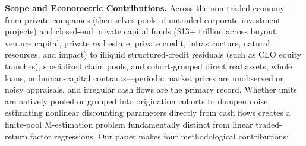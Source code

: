\documentclass[11pt]{article}
\begin{document}
\textbf{Scope and Econometric Contributions.} Across the non-traded economy---from private companies (themselves pools of untraded corporate investment projects) and closed-end private capital funds (\$13+ trillion across buyout, venture capital, private real estate, private credit, infrastructure, natural resources, and impact) to illiquid structured-credit residuals (such as CLO equity tranches), specialized claim pools, and cohort-grouped direct real assets, whole loans, or human-capital contracts---periodic market prices are unobserved or noisy appraisals, and irregular cash flows are the primary record. Whether units are natively pooled or grouped into origination cohorts to dampen noise, estimating nonlinear discounting parameters directly from cash flows creates a finite-pool M-estimation problem fundamentally distinct from linear traded-return factor regressions. Our paper makes four methodological contributions:
\end{document}
